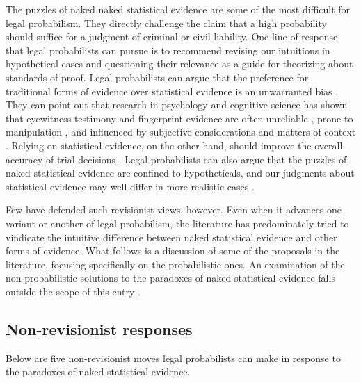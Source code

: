 \documentclass{article}
\begin{document}
The puzzles of naked naked statistical evidence are some of the most difficult for legal probabilism. They directly challenge the claim that a high probability should suffice for a judgment  of criminal or civil liability.  One line of  response  that legal probabilists can pursue is to recommend revising our intuitions in hypothetical cases and questioning their relevance as a guide for theorizing about  standards of proof.
Legal probabilists can argue that the preference for traditional forms of evidence over statistical evidence is an unwarranted bias \citep{laudan2006truth, papineau2019}.
They can point out that research in psychology and cognitive science has shown that eyewitness testimony and fingerprint evidence are often unreliable \citep{Simons1999Gorillas},  prone to manipulation \citep{Loftus1996}, and influenced  by subjective considerations and matters of context \citep{Dror2006, Zabell2005Fingerprint-Evi}. 
Relying on statistical  evidence, on the other hand, should improve the overall accuracy of trial decisions \citep{Koehler1990Veridical-Verdi}. 
Legal probabilists can also argue that the puzzles of naked statistical evidence are confined to hypotheticals, and our judgments about statistical evidence  may well differ in more realistic cases \citep{HeddenColyvan2019legal, ross2020}.


 Few have defended such revisionist views, however. Even when it advances one variant or another of legal probabilism, the literature has predominately tried to vindicate the intuitive difference between naked statistical evidence and other forms of evidence. %
What follows is a discussion of some of the proposals in the literature, focusing specifically on the probabilistic ones. An examination of the non-probabilistic solutions to the paradoxes of naked statistical evidence falls outside the scope of this entry 
\cite[for  critical surveys, see][]{redmayne2008exploring,gardiner2018,pardo2019}.


\subsection{Non-revisionist responses}


Below are five non-revisionist moves legal probabilists can make in response to the paradoxes of naked statistical evidence.  
\end{document}
